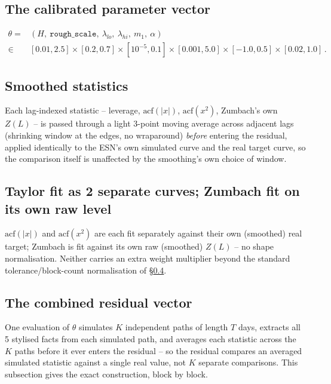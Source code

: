 \documentclass[11pt]{article}
\begin{document}
\subsection{The calibrated parameter vector}
\begin{equation}
\begin{split}
\theta = {}& (H,\ \texttt{rough\_scale},\ \lambda_{lo},\ \lambda_{hi},\ m_1,\
\alpha) \\
{}\in{}& [0.01,2.5]\times[0.2,0.7]\times[10^{-5},0.1]\times
[0.001,5.0]\times[-1.0,0.5]\times[0.02,1.0]\, .
\end{split}
\label{eq:theta}
\end{equation}

\subsection{Smoothed statistics}
\label{sec:smoothing}
Each lag-indexed statistic -- leverage, $\text{acf}(|x|)$, $\text{acf}(x^2)$,
Zumbach's own $Z(L)$ -- is passed through a light 3-point moving average
across adjacent lags (shrinking window at the edges, no wraparound)
\emph{before} entering the residual, applied identically to the ESN's own
simulated curve and the real target curve, so the comparison itself is
unaffected by the smoothing's own choice of window.

\subsection{Taylor fit as 2 separate curves; Zumbach fit on its own raw level}
\label{sec:separatefit}
$\text{acf}(|x|)$ and $\text{acf}(x^2)$ are each fit separately against
their own (smoothed) real target; Zumbach is fit against its own raw
(smoothed) $Z(L)$ -- no shape normalisation. Neither carries an extra
weight multiplier beyond the standard tolerance/block-count normalisation
of \S\ref{sec:residual}.

\subsection{The combined residual vector}
\label{sec:residual}
One evaluation of $\theta$ simulates $K$ independent paths of length $T$
days, extracts all 5 stylised facts from each simulated path, and
averages each statistic across the $K$ paths before it ever enters the
residual -- so the residual compares an averaged simulated statistic
against a single real value, not $K$ separate comparisons. This
subsection gives the exact construction, block by block.
\end{document}
